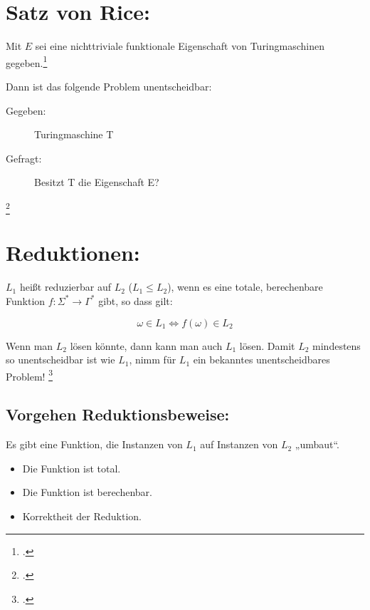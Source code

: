 \documentclass{bschlangaul-theorie}
\begin{document}
\section{Satz von Rice:}

Mit $E$ sei eine nichttriviale funktionale Eigenschaft von
Turingmaschinen gegeben.\footcite[Seite 324]{hoffmann}

Dann ist das folgende Problem unentscheidbar:
\begin{description}
\item[Gegeben:] Turingmaschine T

\item[Gefragt:] Besitzt T die Eigenschaft E?
\end{description}
\footcite[Seite 43]{theo:fs:4}

%

\section{Reduktionen:}

$L_1$ heißt reduzierbar auf $L_2$ ($L_1 \leq L_2$), wenn es eine totale,
berechenbare Funktion $f \colon \Sigma^* \rightarrow \Gamma^*$ gibt, so
dass gilt:

\begin{displaymath}
\omega \in L_1 \Leftrightarrow f(\omega) \in L_2
\end{displaymath}

Wenn man $L_2$ lösen könnte, dann kann man auch $L_1$ lösen. Damit $L_2$
mindestens so unentscheidbar ist wie $L_1$, nimm für $L_1$ ein bekanntes
unentscheidbares Problem!
\footcite[Seite 44]{theo:fs:4}

\subsection{Vorgehen Reduktionsbeweise:}

Es gibt eine Funktion, die Instanzen von $L_1$ auf Instanzen von $L_2$
„umbaut“.

\begin{itemize}
\item Die Funktion ist total.
\item Die Funktion ist berechenbar.
\item Korrektheit der Reduktion.
\end{itemize}
\end{document}
